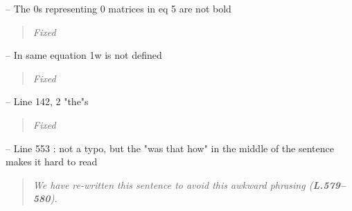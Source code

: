 \documentclass[11pt]{article}
\begin{document}
\noindent-- The 0s representing 0 matrices in eq 5 are not bold
\begin{quote}
	{\itshape Fixed}
\end{quote}

\noindent-- In same equation 1w is not defined
\begin{quote}
	{\itshape Fixed}
\end{quote}

\noindent-- Line 142, 2 "the"s
\begin{quote}
	{\itshape Fixed}
\end{quote}

\noindent-- Line 553 : not a typo, but the "was that how" in the middle of the sentence makes it hard to read
\begin{quote}
	{\itshape We have re-written this sentence to avoid this awkward phrasing ({\bf L.579--580}).}
\end{quote}
\end{document}
